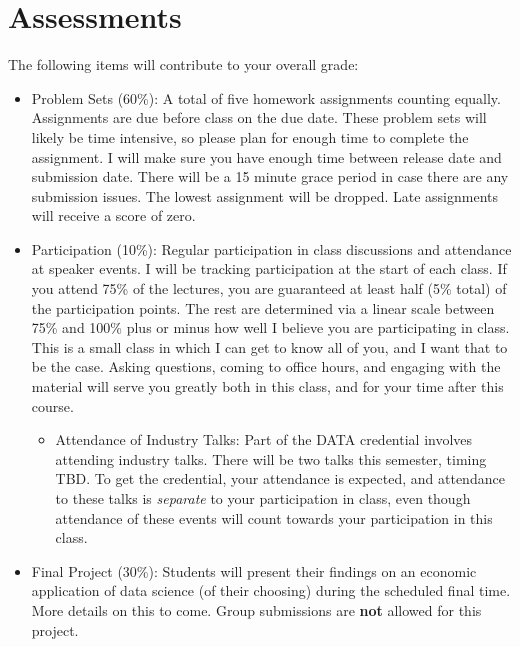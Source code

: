 \documentclass[11pt]{article}
\begin{document}
\section*{Assessments}
The following items will contribute to your overall grade:

\begin{itemize}
    
    \item Problem Sets (60\%): A total of five homework assignments counting equally. Assignments are due before class on the due date. These problem sets will likely be time intensive, so please plan for enough time to complete the assignment. I will make sure you have enough time between release date and submission date. There will be a 15 minute grace period in case there are any submission issues. The lowest assignment will be dropped. Late assignments will receive a score of zero. 
    
    \item Participation (10\%): Regular participation in class discussions and attendance at speaker events. I will be tracking participation at the start of each class. If you attend 75\% of the lectures, you are guaranteed at least half (5\% total) of the participation points. The rest are determined via a linear scale between 75\% and 100\% plus or minus how well I believe you are participating in class. This is a small class in which I can get to know all of you, and I want that to be the case. Asking questions, coming to office hours, and engaging with the material will serve you greatly both in this class, and for your time after this course.
    
    \begin{itemize}
    	\item Attendance of Industry Talks: Part of the DATA credential involves attending industry talks. There will be two talks this semester, timing TBD. To get the credential, your attendance is expected, and attendance to these talks is \textit{separate} to your participation in class, even though attendance of these events will count towards your participation in this class.
    \end{itemize}
    
    \item Final Project (30\%): Students will present their findings on an economic application of data science (of their choosing) during the scheduled final time. More details on this to come. Group submissions are \textbf{not} allowed for this project. 
\end{itemize}
\end{document}
